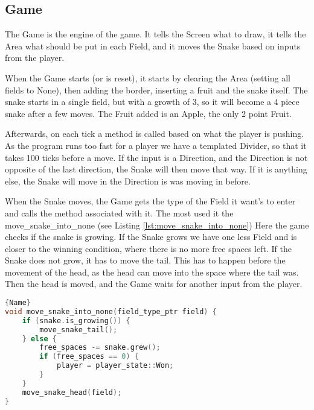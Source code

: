 \subsection{Game}

The Game is the engine of the game. It tells the Screen what to draw, it tells the Area what should be put in each Field, and it moves the Snake based on inputs from the player.

When the Game starts (or is reset), it starts by clearing the Area (setting all fields to None), then adding the border, inserting a fruit and the snake itself. The snake starts in a single field, but with a growth of 3, so it will become a 4 piece snake after a few moves. The Fruit added is an Apple, the only 2 point Fruit.

Afterwards, on each tick a method is called based on what the player is pushing. As the program runs too fast for a player we have a templated Divider, so that it takes 100 ticks before a move. If the input is a Direction, and the Direction is not opposite of the last direction, the Snake will then move that way. If it is anything else, the Snake will move in the Direction is was moving in before.

When the Snake moves, the Game gets the type of the Field it want's to enter and calls the method associated with it. The most used it the move\_snake\_into\_none (see Listing \ref{lst:move_snake_into_none}) Here the game checks if the snake is growing. If the Snake grows we have one less Field and is closer to the winning condition, where there is no more free spaces left. If the Snake does not grow, it has to move the tail. This has to happen before the movement of the head, as the head can move into the space where the tail was. Then the head is moved, and the Game waits for another input from the player.

\begin{lstlisting}[caption={Moving the Snake into an empty Field},label={lst:move_snake_into_none},frame=tlrb, language=C++]{Name}
void move_snake_into_none(field_type_ptr field) {
    if (snake.is_growing()) {
        move_snake_tail();
    } else {
        free_spaces -= snake.grew();
        if (free_spaces == 0) {
            player = player_state::Won;
        }
    }
  	move_snake_head(field);
}
\end{lstlisting}
